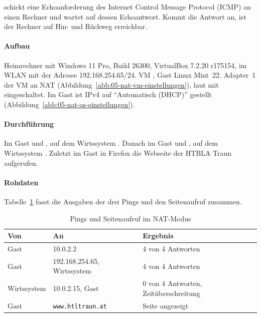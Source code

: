  schickt eine Echoanforderung des Internet Control Message Protocol (ICMP) an einen Rechner und wartet auf dessen Echoantwort. Kommt die Antwort an, ist der Rechner auf Hin- und Rückweg erreichbar.

\begin{messung}
\paragraph{Aufbau} Heimrechner mit Windows 11 Pro, Build 26300, VirtualBox 7.2.20 r175154, im WLAN mit der Adresse 192.168.254.65/24. VM , Gast Linux Mint~22. Adapter~1 der VM an NAT (Abbildung~\ref{abb:05-nat-vm-einstellungen}), laut  mit  eingeschaltet. Im Gast ist IPv4 auf \enquote{Automatisch (DHCP)} gestellt (Abbildung~\ref{abb:05-nat-os-einstellungen}).



\paragraph{Durchführung} Im Gast  und , auf dem Wirtssystem . Danach im Gast  und , auf dem Wirtssystem . Zuletzt im Gast in Firefox die Webseite der HTBLA Traun aufgerufen.

\paragraph{Rohdaten} Tabelle~\ref{tab:nat-ping} fasst die Ausgaben der drei Pings und den Seitenaufruf zusammen.

\begin{table}[H]
\centering
\caption{Pings und Seitenaufruf im NAT-Modus}
\label{tab:nat-ping}
\begin{tabularx}{\textwidth}{@{}llX@{}}
\toprule
\textbf{Von} & \textbf{An} & \textbf{Ergebnis} \\
\midrule
Gast & 10.0.2.2 & 4 von 4 Antworten \\
Gast & 192.168.254.65, Wirtssystem & 4 von 4 Antworten \\
Wirtssystem & 10.0.2.15, Gast & 0 von 4 Antworten, Zeitüberschreitung \\
Gast & \nolinkurl{www.htltraun.at} & Seite angezeigt \\
\bottomrule
\end{tabularx}
\end{table}


\end{messung}
